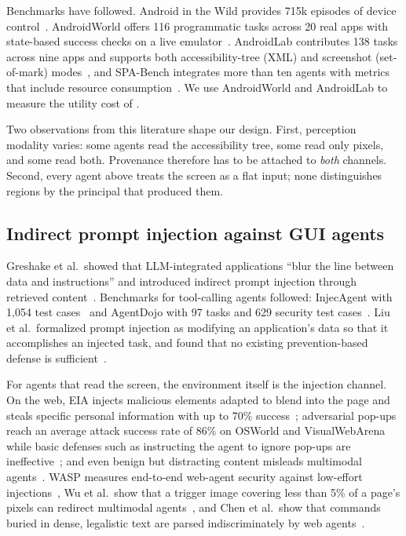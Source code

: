 Benchmarks have followed. Android in the Wild provides 715k episodes of device control~\cite{rawles2023aitw}. AndroidWorld offers 116 programmatic tasks across 20 real apps with state-based success checks on a live emulator~\cite{rawles2025androidworld}. AndroidLab contributes 138 tasks across nine apps and supports both accessibility-tree (XML) and screenshot (set-of-mark) modes~\cite{xu2025androidlab}, and SPA-Bench integrates more than ten agents with metrics that include resource consumption~\cite{chen2025spabench}. We use AndroidWorld and AndroidLab to measure the utility cost of \PG{}.

Two observations from this literature shape our design. First, perception modality varies: some agents read the accessibility tree, some read only pixels, and some read both. Provenance therefore has to be attached to \emph{both} channels. Second, every agent above treats the screen as a flat input; none distinguishes regions by the principal that produced them.

\subsection{Indirect prompt injection against GUI agents}\label{sec:rw-attacks}

Greshake et al.\ showed that LLM-integrated applications ``blur the line between data and instructions'' and introduced indirect prompt injection through retrieved content~\cite{greshake2023notwhat}. Benchmarks for tool-calling agents followed: InjecAgent with 1,054 test cases~\cite{zhan2024injecagent} and AgentDojo with 97 tasks and 629 security test cases~\cite{debenedetti2024agentdojo}. Liu et al.\ formalized prompt injection as modifying an application's data so that it accomplishes an injected task, and found that no existing prevention-based defense is sufficient~\cite{liu2024formalizing}.

For agents that read the screen, the environment itself is the injection channel. On the web, EIA injects malicious elements adapted to blend into the page and steals specific personal information with up to 70\% success~\cite{liao2025eia}; adversarial pop-ups reach an average attack success rate of 86\% on OSWorld and VisualWebArena while basic defenses such as instructing the agent to ignore pop-ups are ineffective~\cite{zhang2025popups}; and even benign but distracting content misleads multimodal agents~\cite{ma2025caution}. WASP measures end-to-end web-agent security against low-effort injections~\cite{evtimov2025wasp}, Wu et al.\ show that a trigger image covering less than 5\% of a page's pixels can redirect multimodal agents~\cite{wu2025dissecting}, and Chen et al.\ show that commands buried in dense, legalistic text are parsed indiscriminately by web agents~\cite{chen2025fineprint}.

